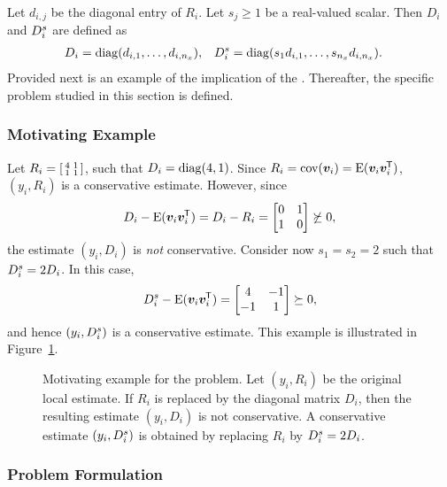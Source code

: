 Let $d_{i,j}$ be the \jth diagonal entry of $R_i$. Let $s_j\geq1$ be a real-valued scalar. Then $D_i$ and $\Ds_i$ are defined as
\begin{align}
	D_i &= \diag(d_{i,1},\dots,d_{i,\nx}), &
	\Ds_i &= \diag(s_1d_{i,1},\dots,s_{\nx}d_{i,\nx}).
	\label{eq:dca-matrices}
\end{align} 
Provided next is an example of the implication of the \abbrDCA. Thereafter, the specific problem studied in this section is defined.


\subsubsection{Motivating Example}

Let $R_i = \BBSM4&1\\1&1\EBSM$, such that $D_i=\diag(4,1)$. Since $R_i=\cov(\bfv_i) = \EV(\bfv_i\bfv_i\trnsp)$, $(y_i,R_i)$ is a conservative estimate. However, since  
\begin{equation*}
	D_i - \EV(\bfv_i\bfv_i\trnsp) = D_i - R_i = \BBM0&1\\1&0\EBM \not\succeq0,
\end{equation*}
the estimate $(y_i,D_i)$ is \emph{not} conservative. Consider now $s_1=s_2=2$ such that $\Ds_i=2D_i$. In this case, 
\begin{equation*}
	\Ds_i - \EV(\bfv_i\bfv_i\trnsp) = \BBM4&-1\\-1&1 \EBM \succeq0,
\end{equation*}
and hence $(y_i,\Ds_i)$ is a conservative estimate. This example is illustrated in Figure~\ref{fig:dca:motivating-example}.

\begin{figure}[tb]
	\centering
	\begin{tikzpicture}[scale=.75]
		
	\end{tikzpicture}
	\caption{Motivating example for the \abbrDCA problem. Let $(y_i,R_i)$ be the original local estimate. If $R_i$ is replaced by the diagonal matrix $D_i$, then the resulting estimate $(y_i,D_i)$ is not conservative. A conservative estimate $(y_i,\Ds_i)$ is obtained by replacing $R_i$ by $\Ds_i=2D_i$. }
	\label{fig:dca:motivating-example}
\end{figure}


\subsubsection{Problem Formulation}

